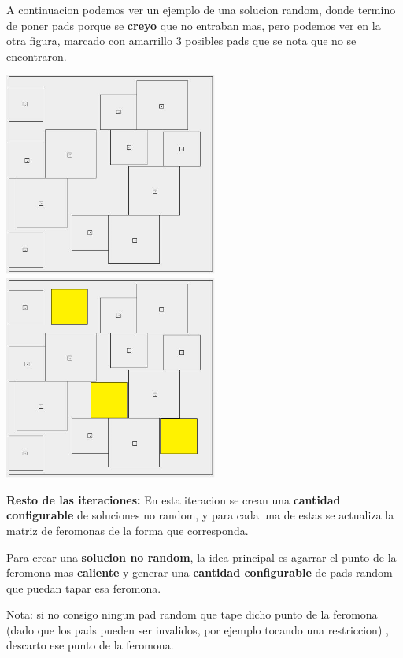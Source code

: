 A continuacion podemos ver un ejemplo de una solucion random, donde termino de poner pads porque se \textbf{creyo} que no entraban mas, pero podemos ver en la otra figura, marcado con amarrillo 3 posibles pads que se nota que no se encontraron.

\begin{center}
\includegraphics[width=7cm]{imagenes/ejemplo2}
\includegraphics[width=7cm]{imagenes/ejemplo3}
\end{center}




\textbf{Resto de las iteraciones:} En esta iteracion se crean una \textbf{cantidad configurable} de soluciones no random, y para cada una de estas se actualiza la matriz de feromonas de la forma que corresponda.

Para crear una \textbf{solucion no random}, la idea principal es agarrar el punto de la feromona mas \textbf{caliente} y generar una \textbf{cantidad configurable} de pads random que puedan tapar esa feromona. 

Nota: si no consigo ningun pad random que tape dicho punto de la feromona (dado que los pads pueden ser invalidos, por ejemplo tocando una restriccion) , descarto ese punto de la feromona. 


